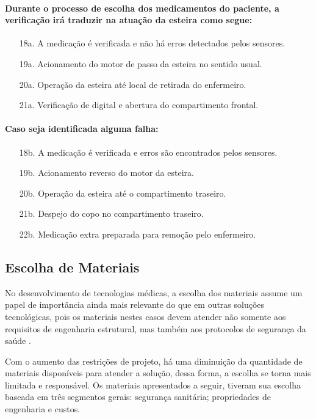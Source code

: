 \paragraph*{Durante o processo de escolha dos medicamentos do paciente, a verificação irá traduzir na atuação da esteira como segue:}

\begin{enumerate}
    \item[18a.] A medicação é verificada e não há erros detectados pelos sensores.
    \item[19a.] Acionamento do motor de passo da esteira no sentido usual.
    \item[20a.] Operação da esteira até local de retirada do enfermeiro. 
    \item[21a.] Verificação de digital e abertura do compartimento frontal.
\end{enumerate}
   
\paragraph*{Caso seja identificada alguma falha:}

\begin{enumerate}
    \item[18b.] A medicação é verificada e erros são encontrados pelos sensores.
    \item[19b.] Acionamento reverso do motor da esteira.
    \item[20b.] Operação da esteira até o compartimento traseiro.
    \item[21b.] Despejo do copo no compartimento traseiro.
    \item[22b.] Medicação extra preparada para remoção pelo enfermeiro.
\end{enumerate}

\subsection{Escolha de Materiais}
No desenvolvimento de tecnologias médicas, a escolha dos materiais assume um papel de importância ainda mais relevante do que em outras soluções tecnológicas, pois os materiais nestes casos devem atender não somente aos requisitos de engenharia estrutural, mas também aos protocolos de segurança da saúde \cite{Steel_Group}.

Com o aumento das restrições de projeto, há uma diminuição da quantidade de materiais disponíveis para atender a solução, dessa forma, a escolha se torna mais limitada e responsável. Os materiais apresentados a seguir, tiveram sua escolha baseada em três segmentos gerais: segurança sanitária; propriedades de engenharia e custos.

